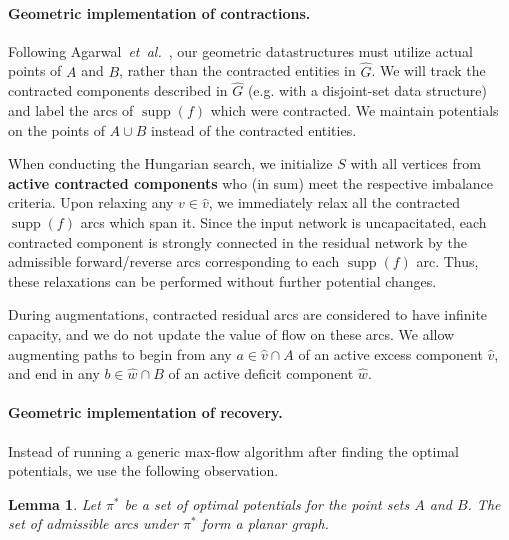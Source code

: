 \documentclass[11pt]{article}
\def\etal{\textit{et~al.}}
\def\supp{\operatorname{supp}}
\theoremstyle{plain}
\newtheorem{lemma}{Lemma}[section]
\numberwithin{figure}{section}
\def\EMPH#1{\textbf{\boldmath #1}}
\begin{document}
\paragraph{Geometric implementation of contractions.}
Following Agarwal~\etal~\cite{AFPVX17}, our geometric datastructures must
utilize actual points of $A$ and $B$, rather than the contracted entities in
$\hat{G}$.
We will track the contracted components described in $\hat{G}$ (e.g. with a
disjoint-set data structure) and label the arcs of $\supp(f)$ which were
contracted.
We maintain potentials on the points of $A \cup B$ instead of the contracted
entities.

When conducting the Hungarian search, we initialize $S$ with all vertices from
\EMPH{active contracted components} who (in sum) meet the respective imbalance
criteria.
Upon relaxing any $v \in \hat{v}$, we immediately relax all the contracted
$\supp(f)$ arcs which span it.
Since the input network is uncapacitated, each contracted component is
strongly connected in the residual network by the admissible forward/reverse
arcs corresponding to each $\supp(f)$ arc.
Thus, these relaxations can be performed without further potential changes.

During augmentations, contracted residual arcs are considered to have infinite
capacity, and we do not update the value of flow on these arcs.
We allow augmenting paths to begin from any $a \in \hat{v} \cap A$ of an active
excess component $\hat{v}$, and end in any $b \in \hat{w} \cap B$ of an active
deficit component $\hat{w}$.

\paragraph{Geometric implementation of recovery.}
Instead of running a generic max-flow algorithm after finding the optimal
potentials, we use the following observation.

\begin{lemma}
Let $\pi^*$ be a set of optimal potentials for the point sets $A$ and $B$.
The set of admissible arcs under $\pi^*$ form a planar graph.
\end{lemma}
\end{document}
